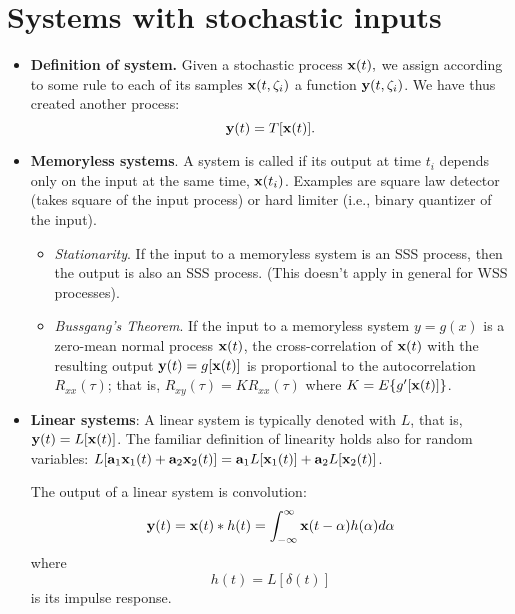 \documentclass[a4paper, oneside]{book}
\begin{document}
\section{Systems with stochastic inputs}
\begin{itemize}
\item \textbf{Definition of system.} Given a stochastic process $\mathbf x(t),$ we assign according to some rule to each of its samples $\mathbf x(t,\zeta_i)$ a function $\mathbf y(t,\zeta_i)$. We have thus created another process:
\begin{equation}
\mathbf y(t) = T[\mathbf x(t)].
\end{equation}
\item \textbf{Memoryless systems}. A system is called if its output at time $t_i$ depends only on the input at the same time, $\mathbf x(t_i)$. Examples are square law detector (takes square of the input process) or hard limiter (i.e., binary quantizer of the input).
	\begin{itemize}
	\item \textit{Stationarity}. If the input to a memoryless system is an SSS process, then the output is also an SSS process. (This doesn't apply in general for WSS processes).
	\item \textit{Bussgang's Theorem}. If the input to a memoryless system $y=g(x)$ is a zero-mean normal process $\mathbf x(t)$, the cross-correlation of $\mathbf x(t)$ with the resulting output $\mathbf y(t) = g[\mathbf x(t)]$ is proportional to the autocorrelation $R_{xx}(\tau)$; that is, $R_{xy}(\tau)=K R_{xx}(\tau)$ where $K=E\{g'[\mathbf x(t)]\}$.
	\end{itemize}
\item \textbf{Linear systems}: A linear system is typically denoted with $L$, that is, $\mathbf y(t) = L[\mathbf x(t)]$. The familiar definition of linearity holds also for random variables: $L[\mathbf a_1 \mathbf x_1(t) + \mathbf a_2 \mathbf x_2(t)]=\mathbf a_1 L[\mathbf x_1(t)]+\mathbf a_2 L[\mathbf x_2(t)]$.

The output of a linear system is convolution:
\begin{equation}
\mathbf y(t) = \mathbf x(t) * h(t) = \int_{-\infty}^\infty \mathbf x(t-\alpha) h(\alpha) d\alpha
\end{equation}
where
\begin{equation}
h(t) = L[\delta(t)]
\end{equation}
is its impulse response.
	\begin{itemize}
	

\end{itemize}
\end{itemize}
\end{document}
